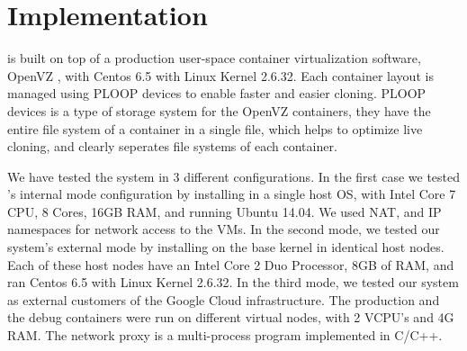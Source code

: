 
\section{Implementation}
\label{sec:implementation}

\parikshan is built on top of a production user-space container virtualization software, OpenVZ \cite{openvz}, with Centos 6.5 with Linux Kernel 2.6.32.
Each container layout is managed using PLOOP\cite{ploop} devices to enable faster and easier cloning.
PLOOP devices is a type of storage system for the OpenVZ containers, they have the entire file system of a container in a single file, which helps to optimize live cloning, and clearly seperates file systems of each container.

We have tested the system in 3 different configurations. In the first case we tested \parikshan 's internal mode configuration by installing \parikshan in a single host OS, with Intel Core 7 CPU, 8 Cores, 16GB RAM, and running Ubuntu 14.04. 
We used NAT, and IP namespaces for network access to the VMs.
In the second mode, we tested our system's external mode by installing \parikshan on the base kernel in identical host nodes. 
Each of these host nodes have an Intel Core 2 Duo Processor, 8GB of RAM, and ran Centos 6.5 with Linux Kernel 2.6.32.
In the third mode, we tested our system as external customers of the Google Cloud infrastructure.
The production and the debug containers were run on different virtual nodes, with 2 VCPU's and 4G RAM. 
The network proxy is a multi-process program implemented in C/C++.
